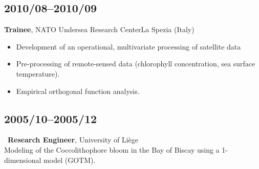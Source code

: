 \documentclass[11pt,a4paper,sans,svgnames]{article}
\begin{document}
\subsection{2010/08--2010/09}

\textbf{Trainee}, {NATO Undersea Research Center}{La Spezia (Italy)}
\begin{itemize}%
\item Development of an operational, multivariate processing of satellite data
\item Pre-processing of remote-sensed data (chlorophyll concentration, sea surface temperature).
\item Empirical orthogonal function analysis.
\end{itemize}


\subsection{2005/10--2005/12}

~\textbf{Research Engineer}, {University of Li\`{e}ge}\\
{Modeling of the Coccolithophore bloom in the Bay of Biscay using a 1-dimensional model (GOTM).}
\end{document}

